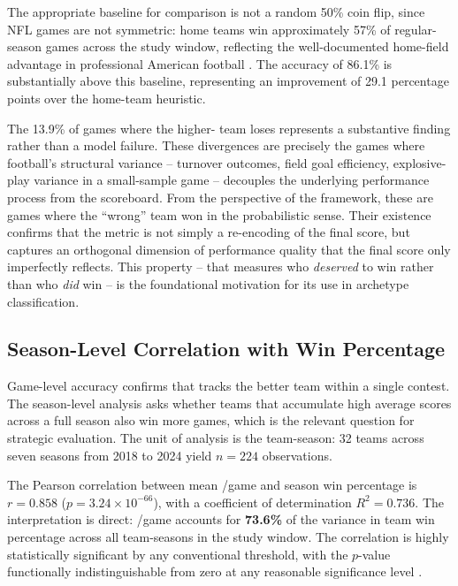 The appropriate baseline for comparison is not a random 50\% coin flip, since
NFL games are not symmetric: home teams win approximately 57\% of regular-season
games across the study window, reflecting the well-documented home-field
advantage in professional American football \parencite{lopez2018randomness}. The
\gds{} accuracy of 86.1\% is substantially above this baseline, representing an
improvement of 29.1 percentage points over the home-team heuristic.

The 13.9\% of games where the higher-\gds{} team loses represents a substantive
finding rather than a model failure. These divergences are precisely the games
where football's structural variance -- turnover outcomes, field goal efficiency,
explosive-play variance in a small-sample game -- decouples the underlying
performance process from the scoreboard. From the perspective of the \gds{}
framework, these are games where the ``wrong'' team won in the probabilistic
sense. Their existence confirms that the metric is not simply a re-encoding of
the final score, but captures an orthogonal dimension of performance quality
that the final score only imperfectly reflects. This property -- that \gds{}
measures who \emph{deserved} to win rather than who \emph{did} win -- is the
foundational motivation for its use in archetype classification.

\subsection{Season-Level Correlation with Win Percentage}
\label{sec:season-correlation}

Game-level accuracy confirms that \gds{} tracks the better team within a single
contest. The season-level analysis asks whether teams that accumulate high
average \gds{} scores across a full season also win more games, which is the
relevant question for strategic evaluation. The unit of analysis is the
team-season: 32 teams across seven seasons from 2018 to 2024 yield $n = 224$
observations.

The Pearson correlation between mean \gds{}/game and season win percentage is
$r = 0.858$ ($p = 3.24 \times 10^{-66}$), with a coefficient of determination
$R^2 = 0.736$. The interpretation is direct: \gds{}/game accounts for
\textbf{73.6\%} of the variance in team win percentage across all team-seasons
in the study window. The correlation is highly statistically significant by
any conventional threshold, with the $p$-value functionally indistinguishable
from zero at any reasonable significance level \parencite{yurko2019nflwar}.


